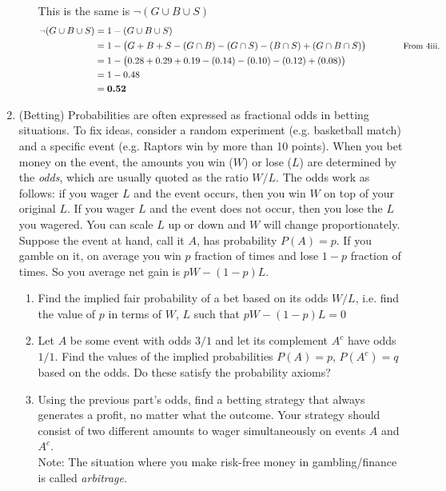 \documentclass[11pt]{article}
\begin{document}
\begin{enumerate}
\begin{enumerate}
\begin{mdframed}
							This is the same is $ \neg (G \cup B \cup S) $
							\begin{align*}
								\neg (G \cup B \cup S) &= 1 - (G \cup B \cup S)\\
								&= 1 - {\left( G + B + S - \left(G \cap B \right) - \left(G \cap S \right) - \left(B \cap S \right)  + \left( G \cap B \cap S \right) \right)} \qquad\qquad\text{{\small From 4iii.}} \\
								&= 1 - \left( 0.28 + 0.29 + 0.19 - \left(0.14\right) - \left(0.10\right) - \left(0.12\right)  + \left(0.08\right) \right)\\
								&= 1 - 0.48\\
								&= \textbf{0.52}
							\end{align*}
						\end{mdframed}
				\end{enumerate}

		\item (Betting) Probabilities are often expressed as fractional odds in betting situations. To fix ideas, consider a random experiment (e.g. basketball match) and a specific event (e.g. Raptors win by more than 10 points). When you bet money on the event, the amounts you win ($ W $) or lose ($ L $) are determined by the \textit{odds}, which are usually quoted as the ratio $ W/L $. The odds work as follows: if you wager $ L $ and the event occurs, then you win $ W $ on top of your original $ L $. If you wager $ L $ and the event does not occur, then you lose the $ L $ you wagered. You can scale $ L $ up or down and $ W $ will change proportionately. Suppose the event at hand, call it $ A $, has probability $ P (A) = p $. If you gamble on it, on average you win $ p $ fraction of times and lose $ 1-p $ fraction of times. So you average net gain is $ pW - (1 - p) L $.
			\begin{enumerate}
				\item Find the implied fair probability of a bet based on its odds $ W/L $, i.e. find the value of $ p $ in terms of $ W $, $ L $ such that $ pW - (1 - p)L = 0 $
				\item Let $ A $ be some event with odds $ 3/1 $ and let its complement $ A^c $ have odds $ 1/1 $. Find the values of the implied probabilities $ P(A) = p$, $ P(A^c) = q $ based on the odds. Do these satisfy the probability axioms?
				\item Using the previous part’s odds, find a betting strategy that always generates a profit, no matter what the outcome. Your strategy should consist of two different amounts to wager simultaneously on events $ A $ and $ A^c $.\\
				Note: The situation where you make risk-free money in gambling/finance is called \emph{arbitrage}.
			\end{enumerate}

	\end{enumerate}
\end{document}
